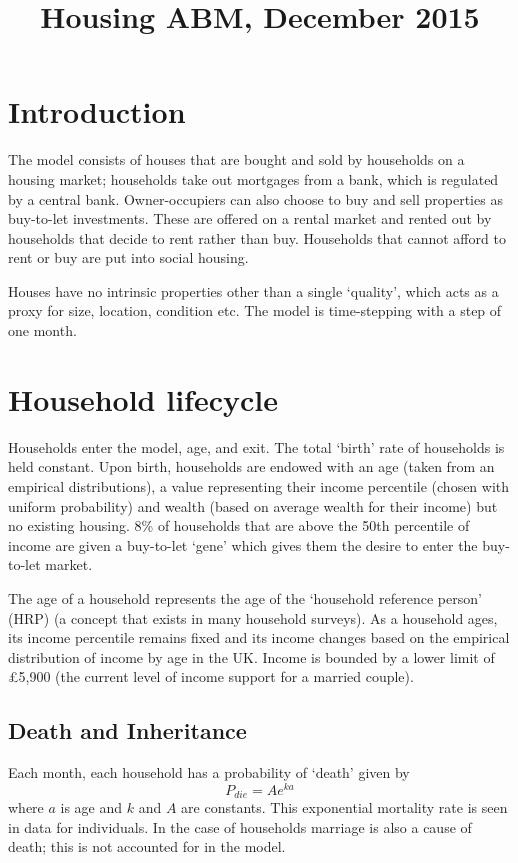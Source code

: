 \documentclass{article}
\begin{document}
\title{Housing ABM, December 2015}
\maketitle

\section{Introduction}
The model consists of houses that are bought and sold by households on a housing market; households take out mortgages from a bank, which is regulated by a central bank. Owner-occupiers can also choose to buy and sell properties as buy-to-let investments. These are offered on a rental market and rented out by households that decide to rent rather than buy. Households that cannot afford to rent or buy are put into social housing.

Houses have no intrinsic properties other than a single `quality', which acts as a proxy for size, location, condition etc. The model is time-stepping with a step of one month.

\section{Household lifecycle}
\label{lifecycle}
Households enter the model, age, and exit. The total `birth' rate of households is held constant. Upon birth, households are endowed with an age (taken from an empirical distributions), a value representing their income percentile (chosen with uniform probability) and wealth (based on average wealth for their income) but no existing housing. 8\% of households that are above the 50th percentile of income are given a buy-to-let `gene' which gives them the desire to enter the buy-to-let market.

The age of a household represents the age of the `household reference person' (HRP) (a concept that exists in many household surveys). As a household ages, its income percentile remains fixed and its income changes based on the empirical distribution of income by age in the UK. Income is bounded by a lower limit of \pounds 5,900 (the current level of income support for a married couple).

\subsection{Death and Inheritance}
Each month, each household has a probability of `death' given by
\begin{equation}
P_{die} = Ae^{ka}
\label{mortality}
\end{equation}
where $a$ is age and $k$ and $A$ are constants. This exponential mortality rate is seen in data for individuals. In the case of households marriage is also a cause of death; this is not accounted for in the model.
\end{document}
